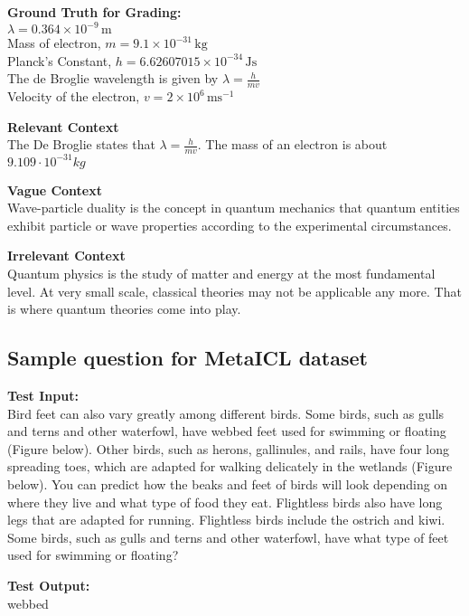 \documentclass{article}
\begin{document}
\textbf{Ground Truth for Grading:} \\
\(\lambda = 0.364 \times 10^{-9} \, \text{m}\) \\
Mass of electron, \( m = 9.1 \times 10^{-31} \, \text{kg} \) \\
Planck's Constant, \( h = 6.62607015 \times 10^{-34} \, \text{Js} \) \\
The de Broglie wavelength is given by \( \lambda = \frac{h}{mv} \) \\
Velocity of the electron, \( v = 2 \times 10^6 \, \text{ms}^{-1} \)

\textbf{Relevant Context}\\
The De Broglie states that $\lambda = \frac{h}{{mv}}$. The mass of an electron is about $9.109 \cdot 10^{-31} kg$

\textbf{Vague Context}\\
Wave-particle duality is the concept in quantum mechanics that quantum entities exhibit particle or wave properties according to the experimental circumstances.

\textbf{Irrelevant Context}\\
Quantum physics is the study of matter and energy at the most fundamental level. At very small scale, classical theories may not be applicable any more. That is where quantum theories come into play.


\subsection{Sample question for MetaICL dataset}
\textbf{Test Input:} \\
Bird feet can also vary greatly among different birds. Some birds, such as gulls and terns and other waterfowl, have webbed feet used for swimming or floating (Figure below). Other birds, such as herons, gallinules, and rails, have four long spreading toes, which are adapted for walking delicately in the wetlands (Figure below). You can predict how the beaks and feet of birds will look depending on where they live and what type of food they eat. Flightless birds also have long legs that are adapted for running. Flightless birds include the ostrich and kiwi. Some birds, such as gulls and terns and other waterfowl, have what type of feet used for swimming or floating?

\bigskip

\textbf{Test Output:} \\
webbed

\bigskip
\end{document}
